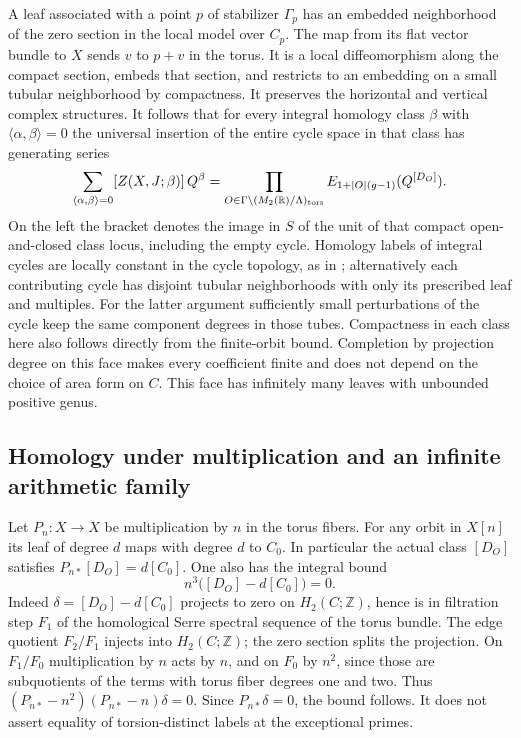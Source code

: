 A leaf associated with a point \(p\) of stabilizer \(\Gamma_p\) has an embedded neighborhood of the zero section in the local model over \(C_p\). The map from its flat vector bundle to \(X\) sends \(v\) to \(p+v\) in the torus. It is a local diffeomorphism along the compact section, embeds that section, and restricts to an embedding on a small tubular neighborhood by compactness. It preserves the horizontal and vertical complex structures. It follows that for every integral homology class \(\beta\) with \(\langle\alpha,\beta\rangle=0\) the universal insertion of the entire cycle space in that class has generating series
\[\sum_{\langle\alpha,\beta\rangle=0} [Z(X,J;\beta)]\,Q^\beta
  = \prod_{O\in\Gamma\backslash(M_2(\mathbb R)/\Lambda)_{\rm tors}}
        E_{1+|O|(g-1)}(Q^{[D_O]}).\]
On the left the bracket denotes the image in \(S\) of the unit of that compact open-and-closed class locus, including the empty cycle. Homology labels of integral cycles are locally constant in the cycle topology, as in \cite{WueProduct}; alternatively each contributing cycle has disjoint tubular neighborhoods with only its prescribed leaf and multiples. For the latter argument sufficiently small perturbations of the cycle keep the same component degrees in those tubes. Compactness in each class here also follows directly from the finite-orbit bound. Completion by projection degree on this face makes every coefficient finite and does not depend on the choice of area form on \(C\). This face has infinitely many leaves with unbounded positive genus.

\subsection{Homology under multiplication and an infinite arithmetic family}

Let \(P_n:X\to X\) be multiplication by \(n\) in the torus fibers. For any orbit in \(X[n]\) its leaf of degree \(d\) maps with degree \(d\) to \(C_0\). In particular the actual class \([D_O]\) satisfies \(P_{n*}[D_O]=d[C_0]\). One also has the integral bound
\[n^3\bigl([D_O]-d[C_0]\bigr)=0.\]
Indeed \(\delta=[D_O]-d[C_0]\) projects to zero on \(H_2(C;\mathbb Z)\), hence is in filtration step \(F_1\) of the homological Serre spectral sequence of the torus bundle. The edge quotient \(F_2/F_1\) injects into \(H_2(C;\mathbb Z)\); the zero section splits the projection. On \(F_1/F_0\) multiplication by \(n\) acts by \(n\), and on \(F_0\) by \(n^2\), since those are subquotients of the terms with torus fiber degrees one and two. Thus \((P_{n*}-n^2)(P_{n*}-n)\delta=0\). Since \(P_{n*}\delta=0\), the bound follows. It does not assert equality of torsion-distinct labels at the exceptional primes.


